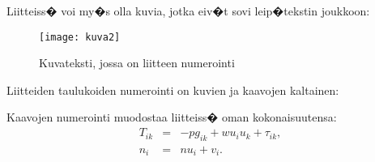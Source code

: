 \documentclass[finnish,12pt,a4paper,pdftex]{article}
\begin{document}
\renewcommand{\theequation}{B\arabic{equation}}
\setcounter{equation}{0}  
\renewcommand{\thefigure}{B\arabic{figure}}
\setcounter{figure}{0}
\renewcommand{\thetable}{B\arabic{table}}
\setcounter{table}{0}

Liitteiss� voi my�s olla kuvia, jotka
eiv�t sovi leip�tekstin joukkoon:
\begin{figure}[htb]
\begin{center}
\texttt{[image: kuva2]}
\end{center}
\caption{Kuvateksti, jossa on liitteen numerointi \label{liitekuva}}
\end{figure}
Liitteiden taulukoiden numerointi on kuvien ja kaavojen kaltainen:
\begin{table}[htb]
\caption{Taulukon kuvateksti. \label{liitetaulukko}}
\begin{center}
\end{center}
\end{table}
Kaavojen numerointi muodostaa liitteiss� oman kokonaisuutensa:
\begin{eqnarray}
T_{ik} &=& -p g_{ik} + w u_i u_k + \tau_{ik},  \label{liitekaava3} \\
n_i    &=& n u_i + v_i.                        \label{liitekaava4}
\end{eqnarray}
\end{document}
